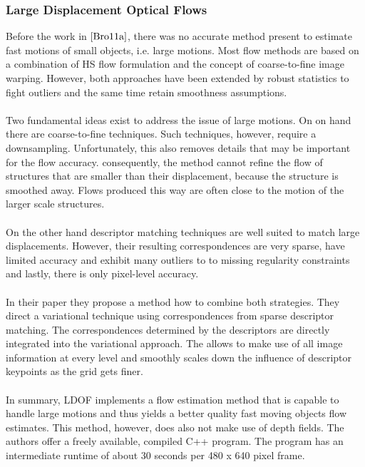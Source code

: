 \subsubsection{Large Displacement Optical Flows}
Before the work in $\cite{Bro11a}$, there was no accurate method present to estimate fast motions of small objects, i.e. large motions. Most flow methods are based on a combination of HS flow formulation and the concept of coarse-to-fine image warping. However, both approaches have been extended by robust statistics to fight outliers and the same time retain smoothness assumptions. \\ \\
Two fundamental ideas exist to address the issue of large motions. On on hand there are coarse-to-fine techniques. Such techniques, however, require a downsampling. Unfortunately, this also removes details that may be important for the flow accuracy. consequently, the method cannot refine the flow of structures that are smaller than their displacement, because the structure is smoothed away. Flows produced this way are often close to the motion of the larger scale structures. \\ \\
On the other hand descriptor matching techniques are well suited to match large displacements. However, their resulting correspondences are very sparse, have limited accuracy and exhibit many outliers to to missing regularity constraints and lastly, there is only pixel-level accuracy. \\ \\
In their paper they propose a method how to combine both strategies. They direct a variational technique using correspondences from sparse descriptor matching. The correspondences determined by the descriptors are directly integrated into the variational approach. The allows to make use of all image information at every level and smoothly scales down the influence of descriptor keypoints as the grid gets finer. \\ \\
In summary, LDOF implements a flow estimation method that is capable to handle large motions and thus yields a better quality fast moving objects flow estimates. This method, however, does also not make use of depth fields. The authors offer a freely available, compiled C++ program. The program has an intermediate runtime of about 30 seconds per 480 x 640 pixel frame.

